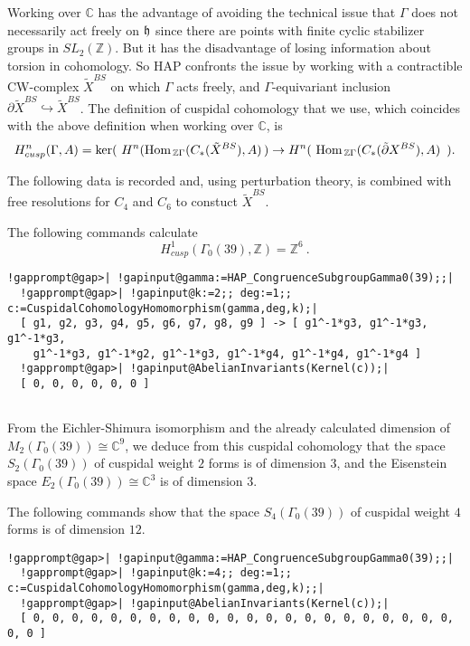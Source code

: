 \documentclass[a4paper,11pt]{report}
\begin{document}
{{ Working over $\mathbb C$ has the advantage of avoiding the technical issue that $\Gamma $ does not necessarily act freely on ${\frak h}$ since there are points with finite cyclic stabilizer groups in $SL_2(\mathbb Z)$. But it has the disadvantage of losing information about torsion in
cohomology. So HAP confronts the issue by working with a contractible
CW-complex $\tilde X^{BS}$ on which $\Gamma$ acts freely, and $\Gamma$-equivariant inclusion $\partial \tilde X^{BS} \hookrightarrow \tilde X^{BS}$. The definition of cuspidal cohomology that we use, which coincides with the
above definition when working over $\mathbb C$, is 
\[ H_{cusp}^n(\Gamma,A) = \ker (\ H^n({\rm Hom}_{\, \mathbb
Z\Gamma}(C_\ast(\tilde X^{BS}), A)\, ) \rightarrow H^n(\ {\rm Hom}_{\, \mathbb
Z\Gamma}(C_\ast(\tilde \partial X^{BS}), A)\, \ ).\]
 

The following data is recorded and, using perturbation theory, is combined
with free resolutions for $C_4$ and $C_6$ to constuct $\tilde X^{BS}$. 

 

 The following commands calculate 
\[H^1_{cusp}(\Gamma_0(39),\mathbb Z) = \mathbb Z^6\ .\]
 
\begin{Verbatim}[commandchars=!@|,fontsize=\small,frame=single,label=Example]
  !gapprompt@gap>| !gapinput@gamma:=HAP_CongruenceSubgroupGamma0(39);;|
  !gapprompt@gap>| !gapinput@k:=2;; deg:=1;; c:=CuspidalCohomologyHomomorphism(gamma,deg,k);|
  [ g1, g2, g3, g4, g5, g6, g7, g8, g9 ] -> [ g1^-1*g3, g1^-1*g3, g1^-1*g3, 
    g1^-1*g3, g1^-1*g2, g1^-1*g3, g1^-1*g4, g1^-1*g4, g1^-1*g4 ]
  !gapprompt@gap>| !gapinput@AbelianInvariants(Kernel(c));|
  [ 0, 0, 0, 0, 0, 0 ]
  
\end{Verbatim}
 From the Eichler-Shimura isomorphism and the already calculated dimension of $M_2(\Gamma_0(39))\cong \mathbb C^9$, we deduce from this cuspidal cohomology that the space $S_2(\Gamma_0(39))$ of cuspidal weight $2$ forms is of dimension $3$, and the Eisenstein space $E_2(\Gamma_0(39))\cong \mathbb C^3$ is of dimension $3$. 

The following commands show that the space $S_4(\Gamma_0(39))$ of cuspidal weight $4$ forms is of dimension $12$. 
\begin{Verbatim}[commandchars=!@|,fontsize=\small,frame=single,label=Example]
  !gapprompt@gap>| !gapinput@gamma:=HAP_CongruenceSubgroupGamma0(39);;|
  !gapprompt@gap>| !gapinput@k:=4;; deg:=1;; c:=CuspidalCohomologyHomomorphism(gamma,deg,k);;|
  !gapprompt@gap>| !gapinput@AbelianInvariants(Kernel(c));|
  [ 0, 0, 0, 0, 0, 0, 0, 0, 0, 0, 0, 0, 0, 0, 0, 0, 0, 0, 0, 0, 0, 0, 0, 0 ]
  

\end{Verbatim}}}
\end{document}
